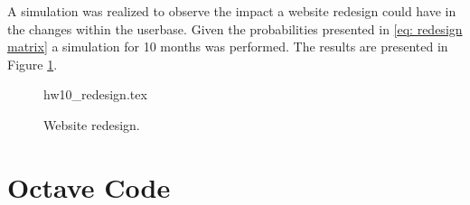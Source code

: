 \documentclass[a4paper,12pt]{article}
\begin{document}
A simulation was realized to observe the impact a website redesign could have in the changes within the userbase.
Given the probabilities presented in \eqref{eq: redesign matrix} a simulation for 10 months was performed.
The results are presented in Figure \ref{fig: redesign}.

\begin{figure}[htb!]
\centering
{hw10_redesign.tex}
\caption{Website redesign.}
\label{fig: redesign}
\end{figure}



\printbibliography

\newpage
\pagebreak
\appendix
\section{Octave Code}

\end{document}
